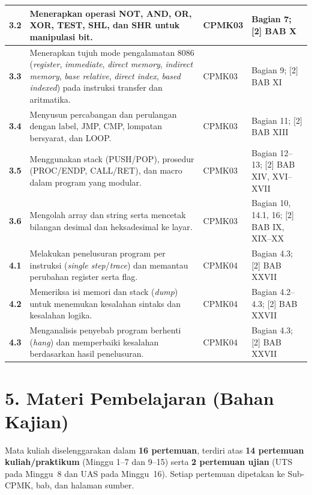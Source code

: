 \documentclass[12pt,a4paper]{article}
\begin{document}
\begin{longtable}{|>{\raggedright\arraybackslash}p{1.55cm}|>{\raggedright\arraybackslash}p{7.5cm}|>{\raggedright\arraybackslash}p{2.05cm}|>{\raggedright\arraybackslash}p{2.2cm}|}
\hline
\textbf{3.2} & Menerapkan operasi NOT, AND, OR, XOR, TEST, SHL, dan SHR untuk manipulasi bit. & CPMK03 & [1] Bagian 7; [2] BAB X \\
\hline
\textbf{3.3} & Menerapkan tujuh mode pengalamatan 8086 (\textit{register}, \textit{immediate}, \textit{direct memory}, \textit{indirect memory}, \textit{base relative}, \textit{direct index}, \textit{based indexed}) pada instruksi transfer dan aritmatika. & CPMK03 & [1] Bagian 9; [2] BAB XI \\
\hline
\textbf{3.4} & Menyusun percabangan dan perulangan dengan label, JMP, CMP, lompatan bersyarat, dan LOOP. & CPMK03 & [1] Bagian 11; [2] BAB XIII \\
\hline
\textbf{3.5} & Menggunakan stack (PUSH/POP), prosedur (PROC/ENDP, CALL/RET), dan macro dalam program yang modular. & CPMK03 & [1] Bagian 12--13; [2] BAB XIV, XVI--XVII \\
\hline
\textbf{3.6} & Mengolah array dan string serta mencetak bilangan desimal dan heksadesimal ke layar. & CPMK03 & [1] Bagian 10, 14.1, 16; [2] BAB IX, XIX--XX \\
\hline
\textbf{4.1} & Melakukan penelusuran program per instruksi (\textit{single step}/\textit{trace}) dan memantau perubahan register serta flag. & CPMK04 & [1] Bagian 4.3; [2] BAB XXVII \\
\hline
\textbf{4.2} & Memeriksa isi memori dan stack (\textit{dump}) untuk menemukan kesalahan sintaks dan kesalahan logika. & CPMK04 & [1] Bagian 4.2--4.3; [2] BAB XXVII \\
\hline
\textbf{4.3} & Menganalisis penyebab program berhenti (\textit{hang}) dan memperbaiki kesalahan berdasarkan hasil penelusuran. & CPMK04 & [1] Bagian 4.3; [2] BAB XXVII \\
\hline
\end{longtable}

\vspace{0.5cm}

\section*{5. Materi Pembelajaran (Bahan Kajian)}

Mata kuliah diselenggarakan dalam \textbf{16 pertemuan}, terdiri atas \textbf{14 pertemuan kuliah/praktikum} (Minggu 1--7 dan 9--15) serta \textbf{2 pertemuan ujian} (UTS pada Minggu~8 dan UAS pada Minggu~16). Setiap pertemuan dipetakan ke Sub-CPMK, bab, dan halaman sumber.
\end{document}
